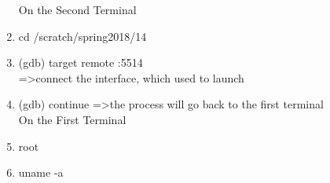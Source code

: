 \documentclass[english,10pt,letterpaper,onecolumn]{IEEEtran}
\begin{document}
\begin{center}
\begin{enumerate}
On the Second Terminal \\
  \item cd /scratch/spring2018/14
  \item (gdb) target remote :5514\\
   =\textgreater connect the interface, which used to launch 
  \item (gdb) continue
   =\textgreater the process will go back to the first terminal\\
On the First Terminal \\
  \item root
  \item uname -a
\end{enumerate}
\end{center}
\clearpage
\end{document}
